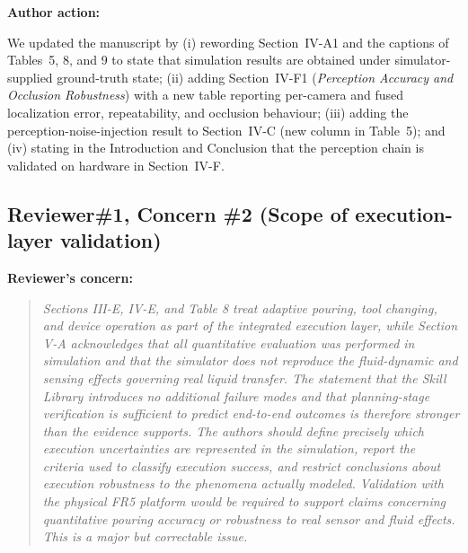 \documentclass[11pt]{article}
\newif\ifshowstatus
\newcommand{\statusline}[2]{\ifshowstatus\par\noindent\textcolor{status#1}{\textbf{Status: \MakeUppercase{#1}.} #2}\par\smallskip\fi}
\newenvironment{concern}[3][pending]{\subsection*{\ifshowstatus\textcolor{status#1}{#2}\else#2\fi}\statusline{#1}{#3}\textbf{Reviewer's concern:}\begin{quote}\itshape}{\end{quote}}
\newenvironment{action}{\textbf{Author action:}\par\smallskip}{\par\bigskip\noindent\hrulefill\par\bigskip}
\begin{document}
\begin{action}
We updated the manuscript by
(i) rewording Section~IV-A1 and the captions of Tables~5, 8, and 9 to state that simulation results are obtained under simulator-supplied ground-truth state;
(ii) adding Section~IV-F1 (\emph{Perception Accuracy and Occlusion Robustness}) with a new table reporting per-camera and fused localization error, repeatability, and occlusion behaviour;
(iii) adding the perception-noise-injection result to Section~IV-C (new column in Table~5);
and (iv) stating in the Introduction and Conclusion that the perception chain is validated on hardware in Section~IV-F.
\end{action}

\begin{concern}[pending]{Reviewer\#1, Concern \#2 (Scope of execution-layer validation)}{Needs A2 and A3 (pouring accuracy) plus the simulation thresholds in C; the claim removal and the scope paragraph can be applied to the manuscript now.}
Sections III-E, IV-E, and Table 8 treat adaptive pouring, tool changing, and device operation as part of the integrated execution layer, while Section V-A acknowledges that all quantitative evaluation was performed in simulation and that the simulator does not reproduce the fluid-dynamic and sensing effects governing real liquid transfer.
The statement that the Skill Library introduces no additional failure modes and that planning-stage verification is sufficient to predict end-to-end outcomes is therefore stronger than the evidence supports.
The authors should define precisely which execution uncertainties are represented in the simulation, report the criteria used to classify execution success, and restrict conclusions about execution robustness to the phenomena actually modeled.
Validation with the physical FR5 platform would be required to support claims concerning quantitative pouring accuracy or robustness to real sensor and fluid effects.
This is a major but correctable issue.
\end{concern}
\end{document}
